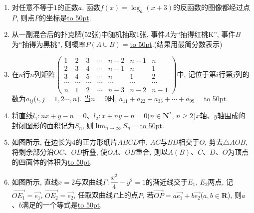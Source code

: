 \documentclass[10pt,a4paper]{article}
\newcommand{\blank}[1]{\underline{\hbox to #1pt{}}}
\begin{document}
\begin{enumerate}[1.]
\begin{center}
\end{center}
\item 对任意不等于$1$的正数$a$, 函数$f(x)=\log_a(x+3)$的反函数的图像都经过点$P$, 则点$P$的坐标是\blank{50}.
\item 从一副混合后的扑克牌($52$张)中随机抽取$1$张, 事件$A$为``抽得红桃K'', 事件$B$为``抽得为黑桃'', 则概率$P(A\cup B)=$\blank{50}.(结果用最简分数表示)
\item 在$n$行$n$列矩阵$\begin{pmatrix}
1 & 2 & 3 & \cdots &  n-2 & n-1 & n  \\ 2 & 3 & 4 & \cdots &  n-1 & n & 1  \\ 3 & 4 & 5 & \cdots &  n & 1 & 2  \\ \cdots &  \cdots &  \cdots &  \cdots  & \cdots &  \cdots &  \cdots   \\ n & 1 & 2 & \cdots &  n-3 & n-2 & n-1  \end{pmatrix}$中, 记位于第$i$行第$j$列的数为$a_{ij}$($i,j=1,2\cdots ,n$). 当$n=9$时, $a_{11}+a_{22}+a_{33}+\cdots +a_{99}=$\blank{50}.
\item 将直线$l_1:nx+y-n=0$、$l_2:x+ny-n=0$($n\in \mathbf{N}^*$, $n\ge 2$)$x$轴、$y$轴围成的封闭图形的面积记为$S_n$, 则$\displaystyle\lim_{n\to\infty} S_n=$\blank{50}.
\item 如图所示, 在边长为$4$的正方形纸片$ABCD$中, $AC$与$BD$相交于$O$, 剪去$\triangle AOB$, 将剩余部分沿$OC$、$OD$折叠, 使$OA$、$OB$重合, 则以$A(B)$、$C$、$D$、$O$为顶点的四面体的体积为\blank{50}.
\begin{center}
\end{center}
\item 如图所示, 直线$x=2$与双曲线$\Gamma :\dfrac{x^2}4-y^2=1$的渐近线交于$E_1$, $E_2$两点, 记$\overrightarrow{OE_1}=\overrightarrow{e_1}$, $\overrightarrow{OE_2}=\overrightarrow{e_2}$, 任取双曲线$\Gamma$上的点$P$, 若$\overrightarrow{OP}=a\overrightarrow{e_1}+b\overrightarrow{e_2}$($a,b\in \mathbf{R}$), 则$a$、$b$满足的一个等式是\blank{50}.

\end{enumerate}
\end{document}
